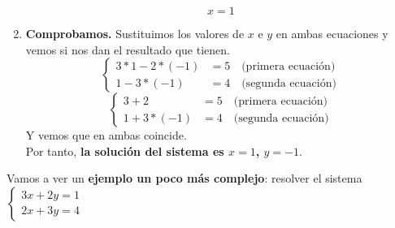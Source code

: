 \documentclass[a4paper,11pt,answers]{exam}
\begin{document}
\begin{enumerate}
    \[x = 1\]
  \item \textbf{Comprobamos.} Sustituimos los valores de $x$ e $y$ en ambas ecuaciones y vemos si nos dan el resultado que tienen.
    \[\begin{cases}
        3*1-2*(-1)&=5 \quad \text{(primera ecuación)}\\
        1-3*(-1) &= 4 \quad \text{(segunda ecuación)}
      \end{cases}\]
    \[\begin{cases}
        3+2&=5 \quad \text{(primera ecuación)}\\
        1+3*(-1) &= 4 \quad \text{(segunda ecuación)}
      \end{cases}\]
    Y vemos que en ambas coincide.\\
    Por tanto, \textbf{la solución del sistema es $x=1$, $y=-1$}.
  \end{enumerate}
  Vamos a ver un \textbf{ejemplo un poco más complejo}: resolver el sistema
  $\begin{cases}
     3x+2y = 1\\
     2x+3y = 4
   \end{cases}$
\end{document}
